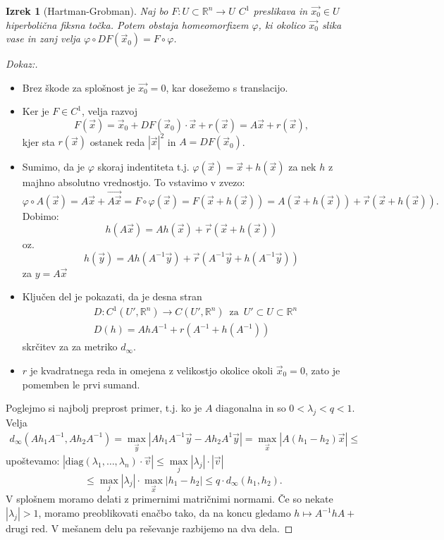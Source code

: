 \documentclass{article}
\newtheorem{izrek}{Izrek}
\newcommand{\R}{\mathbb{R}}
\begin{document}
\begin{izrek}[Hartman-Grobman]
Naj bo $F: U\subset \R^n \rightarrow U$ $C^1$ preslikava in $\vec{x_0} \in U$ 
hiperbolična fiksna točka. Potem obstaja homeomorfizem $\varphi$, ki 
okolico $\vec{x_0}$ slika vase in zanj velja $\varphi \circ DF(\vec{x}_0) = F \circ \varphi$.
\end{izrek}

\begin{proof}[Dokaz:]
\begin{itemize}
    \item Brez škode za splošnost je $\vec{x_0} = 0$, kar dosežemo s translacijo. 
    \item Ker je $F \in C^1$, velja razvoj 
    $$ 
    F(\vec{x}) = \vec{x}_0 + DF(\vec{x}_0)\cdot \vec{x} + r(\vec{x}) 
    = A\vec{x} + r(\vec{x}),
    $$
    kjer sta $r(\vec{x})$ ostanek reda $|\vec{x}|^2$ in $A = DF(\vec{x}_0)$.
    \item Sumimo, da je $\varphi$ skoraj indentiteta t.j. $\varphi(\vec{x}) = \vec{x} + h(\vec{x})$ 
    za nek $h$ z majhno absolutno vrednostjo. To vstavimo v zvezo: 
    $$\varphi \circ A(\vec{x}) = A\vec{x} + \vec{A\vec{x}} = F\circ \varphi(\vec{x}) = F(\vec{x} + h(\vec{x})) = A(\vec{x} + h(\vec{x})) + \vec{r}(\vec{x} + h(\vec{x})).$$
    Dobimo: $$ h(A\vec{x}) = Ah(\vec{x}) + \vec{r}(\vec{x} + h(\vec{x})) $$ oz. 
    $$ h(\vec{y}) = Ah(A^{-1} \vec{y}) + \vec{r}(A^{-1} \vec{y} + h(A^{-1} \vec{y})) $$ za $y = A\vec{x}$
    \item Ključen del je pokazati, da je desna stran 
    \begin{align*}
        &D: C^1(U', \R^n) \rightarrow C(U', \R^n) \,\text{ za }\, U' \subset U \subset \R^n\\
        &D(h) = AhA^{-1} + r(A^{-1} + h(A^{-1}))
    \end{align*}
    skrčitev za za metriko $d_\infty$.    
    \item $r$ je kvadratnega reda in omejena z velikostjo okolice 
    okoli $\vec{x}_0 = 0$, zato je pomemben le prvi sumand.
\end{itemize}
Poglejmo si najbolj preprost primer, t.j. ko je $A$ diagonalna in so 
$0 < \lambda_j < q < 1$. Velja 
\begin{align*}
d_\infty(Ah_1 A^{-1}, A h_2 A^{-1}) = \max\limits_{\vec{y}} |Ah_1 A^{-1} \vec{y} - Ah_2 A^{1} \vec{y}| = 
\max\limits_{\vec{x}} |A(h_1 - h_2)\vec{x}| \leq 
\end{align*}
upoštevamo: $|\text{diag}(\lambda_1, \dots, \lambda_n) \cdot \vec{v}| \leq \max\limits_{j} |\lambda_j| \cdot |\vec{v}|$
$$
\leq \max\limits_{j} |\lambda_j| \cdot \max\limits_{\vec{x}} |h_1 - h_2| \leq q\cdot d_\infty(h_1, h_2).
$$
V splošnem moramo delati z primernimi matričnimi normami. Če so nekate $|\lambda_j| > 1$, 
moramo preoblikovati enačbo tako, da na koncu gledamo $h\mapsto A^{-1} h A + $ drugi red.
V mešanem delu pa reševanje razbijemo na dva dela.
\end{proof}
\end{document}
